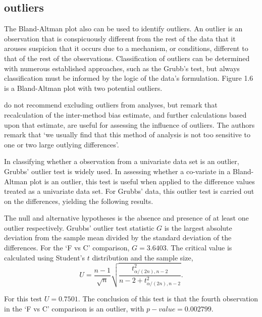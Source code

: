 \documentclass[Main.tex]{subfiles}
\begin{document}
\subsection*{outliers}


The Bland-Altman plot also can be used to identify outliers. An
outlier is an observation that is conspicuously different from the
rest of the data that it arouses suspicion that it occurs due to a
mechanism, or conditions, different to that of the rest of the
observations. Classification of outliers can be determined with
numerous established approaches, such as the Grubb's test, but
always classification must be informed by the logic of the data's
formulation. Figure 1.6 is a Bland-Altman plot with two potential
outliers.


\citet*{BA99} do not recommend excluding outliers from analyses,
but remark that recalculation of the inter-method bias estimate,
and further calculations based upon that estimate, are useful for
assessing the influence of outliers. The authors remark that `we
usually find that this method of analysis is not too sensitive to
one or two large outlying differences'.



In classifying whether a observation from a univariate data set is
an outlier, Grubbs' outlier test is widely used. In assessing
whether a co-variate in a Bland-Altman plot is an outlier, this
test is useful when applied to the difference values treated as a
univariate data set. For Grubbs' data, this outlier test is
carried out on the differences, yielding the following results.

The null and alternative hypotheses is the absence and presence of
at least one outlier respectively. Grubbs' outlier test statistic
$G$ is the largest absolute deviation from the sample mean divided
by the standard deviation of the differences. For the `F vs C'
comparison, $G = 3.6403$. The critical value is calculated using
Student's $t$ distribution and the sample size,
\begin{equation}
U = \frac{n-1}{\sqrt{n}} \sqrt{\frac{t_{\alpha/(2n),n-2}^2}{n - 2
		+ t_{\alpha/(2n),n-2}^2}}.
\end{equation}

For this test $U = 0.7501$. The conclusion of this test is that
the fourth observation in the `F vs C' comparison is an outlier,
with $p-value = 0.002799$.
\end{document}
